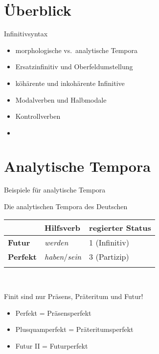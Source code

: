 
\section{Überblick}


\begin{frame}
  {Infinitivsyntax}
  \begin{itemize}[<+->]
    \item morphologische vs.\ analytische Tempora
    \item Ersatzinfinitiv und Oberfeldumstellung
      \Halbzeile
    \item köhärente und inkohärente Infinitive
    \item Modalverben und Halbmodale
    \item Kontrollverben
    \Zeile
    \item \citet{Schaefer2018b}
  \end{itemize}
\end{frame}

\section{Analytische Tempora}

\begin{frame}
  {Beispiele für analytische Tempora}
  \begin{exe}
  \ex\label{ex:analytischetempora216}
  \begin{xlist}
  \end{xlist}
  \ex\label{ex:analytischetempora219}
  \begin{xlist}
  \end{xlist}
  \end{exe}
\end{frame}

\begin{frame}
  {Die analytischen Tempora des Deutschen}
    \centering
  \begin{tabular}{lll}
    \lsptoprule
    & \textbf{Hilfsverb} & \textbf{regierter Status} \\
    \midrule
    \textbf{Futur} & \textit{werden} & 1 (Infinitiv) \\
    \textbf{Perfekt} & \textit{haben}\slash\textit{sein} & 3 (Partizip) \\
    \lspbottomrule
  \end{tabular}\\
  \raggedright
  \Zeile
  Finit sind nur Präsens, Präteritum und Futur!
  \Halbzeile
  \begin{itemize}[<+->]
    \item Perfekt = Präsensperfekt
    \item Plusquamperfekt = Präteritumsperfekt
    \item Futur II = Futurperfekt
  \end{itemize}
\end{frame}


